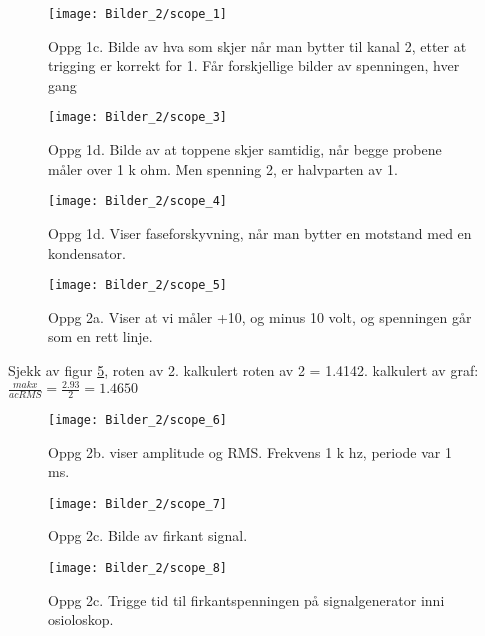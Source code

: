 \documentclass[norsk,10pt,a4paper]{article}
\begin{document}
		\begin{figure} [H]
		\centering
		\texttt{[image: Bilder\_2/scope\_1]}
		\caption{Oppg 1c. Bilde av hva som skjer når man bytter til kanal 2, etter at
		trigging er korrekt for 1. Får forskjellige bilder av spenningen, hver gang}
		\label{fig:scope1}
	\end{figure}

	\begin{figure} [H]
		\centering
		\texttt{[image: Bilder\_2/scope\_3]}
		\caption{Oppg 1d. Bilde av at toppene skjer samtidig, når begge probene måler over 1 k ohm. Men spenning 2, er halvparten av 1.}
		\label{fig:scope3}
	\end{figure}
	
	\begin{figure} [H]
		\centering
		\texttt{[image: Bilder\_2/scope\_4]}
		\caption{Oppg 1d. Viser faseforskyvning, når man bytter en motstand med en kondensator.}
		\label{fig:scope4}
	\end{figure}
	
	\begin{figure} [H]
		\centering
		\texttt{[image: Bilder\_2/scope\_5]}
		\caption{Oppg 2a.
			Viser at vi måler +10, og minus 10 volt, og spenningen går som en rett linje.}
		\label{fig:scope5}
	\end{figure}
	
	Sjekk av figur \ref{fig:scope6}, roten av 2.
	kalkulert roten av 2 = 1.4142.
	kalkulert av graf:
	$\frac{makx}{acRMS} = \frac{2.93}{2} = 1.4650$
	
	\begin{figure} [H]
		\centering
		\texttt{[image: Bilder\_2/scope\_6]}
		\caption{Oppg 2b. viser amplitude og RMS.
			Frekvens 1 k hz, periode var 1 ms.}
		\label{fig:scope6}
	\end{figure}
	
	\begin{figure} [H]
		\centering
		\texttt{[image: Bilder\_2/scope\_7]}
		\caption{Oppg 2c. Bilde av firkant signal.}
		\label{fig:scope7}
	\end{figure}
	
	\begin{figure} [H]
		\centering
		\texttt{[image: Bilder\_2/scope\_8]}
		\caption{Oppg 2c. Trigge tid til firkantspenningen på signalgenerator inni osioloskop.}
		\label{fig:scope8}
	\end{figure}
	
\end{document}
